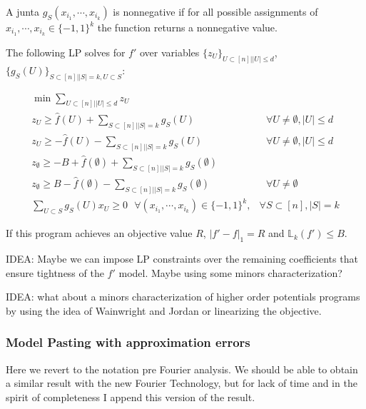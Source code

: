 A junta $g_S(x_{i_1}, \cdots, x_{i_k})$ is nonnegative if for all possible assignments of $x_{i_1}, \cdots, x_{i_k} \in\{-1,1\}^k$ the function returns a nonnegative value. 

The following LP solves for $f'$ over variables $\{z_U\}_{U \subset [n] | |U| \leq d}$, $\{ g_S(U) \}_{S \subset [n] | |S| =k, U \subset S}$:

\begin{align*}
\min \sum_{U \subset [n] | |U| \leq d} z_U \\
z_U \geq \hat{f}(U) + \sum_{S \subset [n] | |S| = k} g_S(U) & \text{ } \forall U \neq \emptyset, |U| \leq d\\
z_U \geq -\hat{f}(U) - \sum_{S \subset [n] | |S| = k} g_S(U) & \text{ } \forall U \neq \emptyset, |U| \leq d \\
z_\emptyset \geq -B + \hat{f}(\emptyset) + \sum_{S \subset [n] | |S| = k} g_S(\emptyset) & \text{ } \\
z_\emptyset \geq B-\hat{f}(\emptyset) - \sum_{S \subset [n] | |S| = k} g_S(\emptyset) & \text{ } \forall U \neq \emptyset \\
\sum_{U \subset S } g_S(U) x_U \geq 0 \text{ } \forall (x_{i_1}, \cdots, x_{i_k} ) \in \{-1,1\}^k, &\forall S \subset [n], |S| = k
\end{align*}

If this program achieves an objective value $R$, $|f' - f|_1 = R$ and $\mathbb{L}_k(f') \leq B$. 







IDEA: Maybe we can impose LP constraints over the remaining coefficients that ensure tightness of the $f'$ model. Maybe using some minors characterization? 


IDEA: what about a minors characterization of higher order potentials programs by using the idea of Wainwright and Jordan or linearizing the objective. 






\subsubsection{ Model Pasting with approximation errors }

Here we revert to the notation pre Fourier analysis. We should be able to obtain a similar result with the new Fourier Technology, but for lack of time and in the spirit of completeness I append this version of the result. 

